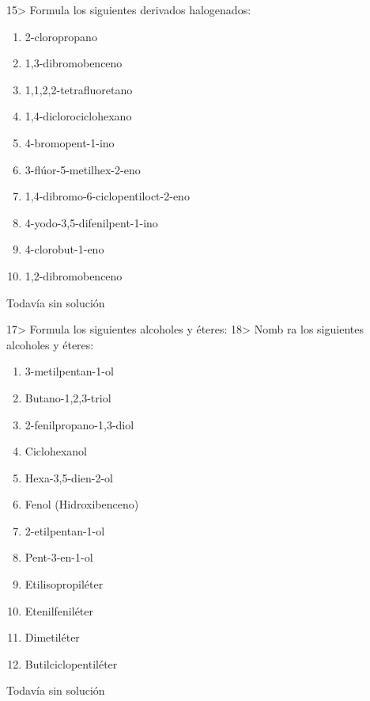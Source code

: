 \documentclass{article}
\begin{document}
\begin{exercise}
  15> Formula los siguientes derivados halogenados:
  \begin{enumerate}
    \item 2-cloropropano
    \item 1,3-dibromobenceno
    \item 1,1,2,2-tetrafluoretano
    \item 1,4-diclorociclohexano
    \item 4-bromopent-1-ino
    \item 3-flúor-5-metilhex-2-eno
    \item 1,4-dibromo-6-ciclopentiloct-2-eno
    \item 4-yodo-3,5-difenilpent-1-ino
    \item 4-clorobut-1-eno
    \item 1,2-dibromobenceno
  \end{enumerate}
\end{exercise}

\begin{solution}[print=false]
  Todavía sin solución
\end{solution}

\begin{exercise}
  17> Formula los siguientes alcoholes y éteres: 18> Nomb ra los siguientes alcoholes y éteres:
  \begin{enumerate}
    \item 3-metilpentan-1-ol
    \item Butano-1,2,3-triol
    \item 2-fenilpropano-1,3-diol
    \item Ciclohexanol
    \item Hexa-3,5-dien-2-ol
    \item Fenol (Hidroxibenceno)
    \item 2-etilpentan-1-ol
    \item Pent-3-en-1-ol
    \item Etilisopropiléter
    \item Etenilfeniléter
    \item Dimetiléter
    \item Butilciclopentiléter
  \end{enumerate}
\end{exercise}

\begin{solution}[print=false]
  Todavía sin solución
\end{solution}
\end{document}
